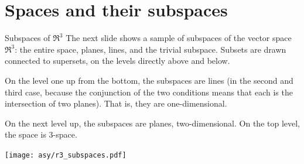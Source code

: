 \section{Spaces and their subspaces}
\begin{frame}{Subspaces of $\Re^3$}
The next slide shows a sample of subspaces of the vector space~$\Re^3$:
the entire space, planes, lines, and the trivial subspace.
Subsets are drawn connected to supersets, on the levels 
directly above and below.

On the level one up from the bottom, the subspaces are lines 
(in the second and third case, because
the conjunction of the two conditions means that each is the 
intersection of two planes).
That is, they are one-dimensional.

On the next level up, the subspaces are planes, two-dimensional.
On the top level, the space is $3$-space.
\end{frame}

\begin{frame}
{\centering\texttt{[image: asy/r3\_subspaces.pdf]}}  
\end{frame}


